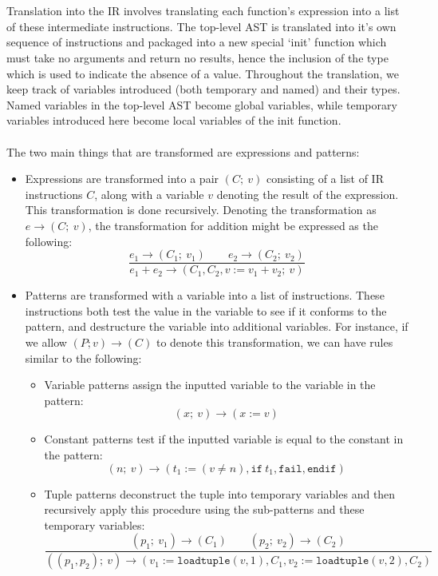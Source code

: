 \\\\
Translation into the IR involves translating each function's expression into a list of these intermediate instructions. The top-level AST is translated into it's own sequence of instructions and packaged into a new special `init' function which must take no arguments and return no results, hence the inclusion of the  type which is used to indicate the absence of a value. Throughout the translation, we keep track of variables introduced (both temporary and named) and their types. Named variables in the top-level AST become global variables, while temporary variables introduced here become local variables of the init function.
\\\\
The two main things that are transformed are expressions and patterns:
\begin{itemize}
    \item Expressions are transformed into a pair $(C;\ v)$ consisting of a list of IR instructions $C$, along with a variable $v$ denoting the result of the expression. This transformation is done recursively. Denoting the transformation as $e \rightarrow (C; \ v)$, the transformation for addition might be expressed as the following:
    $$\dfrac{e_1 \rightarrow (C_1;\ v_1) \qquad e_2 \rightarrow (C_2;\ v_2)}{e_1 + e_2 \rightarrow (C_1,C_2,v := v_1 + v_2;\ v)}$$

    \item Patterns are transformed with a variable into a list of instructions. These instructions both test the value in the variable to see if it conforms to the pattern, and destructure the variable into additional variables. For instance, if we allow $(P; v) \rightarrow (C)$ to denote this transformation, we can have rules similar to the following:
    \begin{itemize}
        \item Variable patterns assign the inputted variable to the variable in the pattern: $$(x;\ v) \rightarrow (x := v)$$
        \item Constant patterns test if the inputted variable is equal to the constant in the pattern: $$(n;\ v) \rightarrow (t_1 := (v \neq n), \texttt{if}\ t_1, \texttt{fail}, \texttt{endif})$$
        \item Tuple patterns deconstruct the tuple into temporary variables and then recursively apply this procedure using the sub-patterns and these temporary variables:
        $$\dfrac{(p_1;\ v_1) \rightarrow (C_1) \qquad (p_2;\ v_2) \rightarrow (C_2)}{((p_1, p_2);\ v) \rightarrow (v_1 := \texttt{loadtuple}(v,1), C_1, v_2 := \texttt{loadtuple}(v,2), C_2)}$$
    \end{itemize}
\end{itemize}

